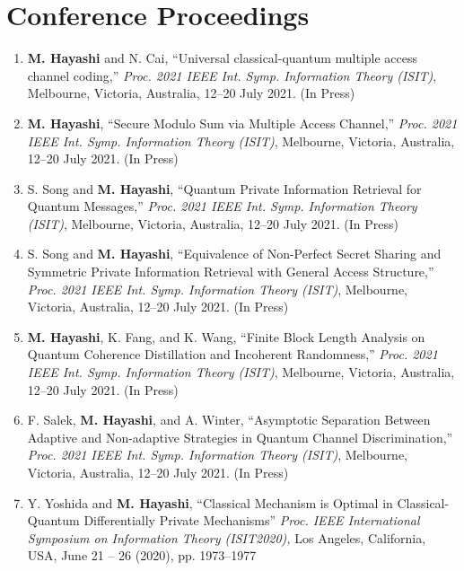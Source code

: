 \documentclass[a4paper,12pt,oneside]{article}
\begin{document}
\section{Conference Proceedings}
\begin{enumerate}
    \item
    \textbf{M. Hayashi} and N. Cai, 
    ``Universal classical-quantum multiple access channel
    coding,''
    {\em Proc. 2021 IEEE Int. Symp. Information Theory (ISIT)}, 
    Melbourne, Victoria, Australia, 12–20 July 2021. (In Press)
    
    \item
    \textbf{M. Hayashi}, 
    ``Secure Modulo Sum via Multiple Access Channel,''
    {\em Proc. 2021 IEEE Int. Symp. Information Theory (ISIT)}, 
    Melbourne, Victoria, Australia, 12–20 July 2021. (In Press)
    
    \item
    S. Song and \textbf{M. Hayashi}, 
    ``Quantum Private Information Retrieval for Quantum Messages,''
    {\em Proc. 2021 IEEE Int. Symp. Information Theory (ISIT)}, 
    Melbourne, Victoria, Australia, 12–20 July 2021. (In Press)
    
    \item
    S. Song and \textbf{M. Hayashi}, 
    ``Equivalence of Non-Perfect Secret Sharing and Symmetric Private Information Retrieval with General Access Structure,''
    {\em Proc. 2021 IEEE Int. Symp. Information Theory (ISIT)}, 
    Melbourne, Victoria, Australia, 12–20 July 2021. (In Press)
    
    \item
    \textbf{M. Hayashi}, K. Fang, and K. Wang,
    ``Finite Block Length Analysis on Quantum
    Coherence Distillation and Incoherent Randomness,''
    {\em Proc. 2021 IEEE Int. Symp. Information Theory (ISIT)}, 
    Melbourne, Victoria, Australia, 12–20 July 2021. (In Press)
    
    \item
    F. Salek, \textbf{M. Hayashi}, and A. Winter, 
    ``Asymptotic Separation Between Adaptive and Non-adaptive Strategies in Quantum Channel Discrimination,''
    {\em Proc. 2021 IEEE Int. Symp. Information Theory (ISIT)}, 
    Melbourne, Victoria, Australia, 12–20 July 2021. (In Press)
    
    \item
    Y. Yoshida and \textbf{M. Hayashi}, 
    ``Classical Mechanism is Optimal in Classical-Quantum Differentially Private Mechanisms''
    {\em Proc. IEEE International Symposium on Information Theory (ISIT2020),} 
    Los Angeles, California, USA, June 21 -- 26 (2020), pp. 1973--1977
    

\end{enumerate}
\end{document}
